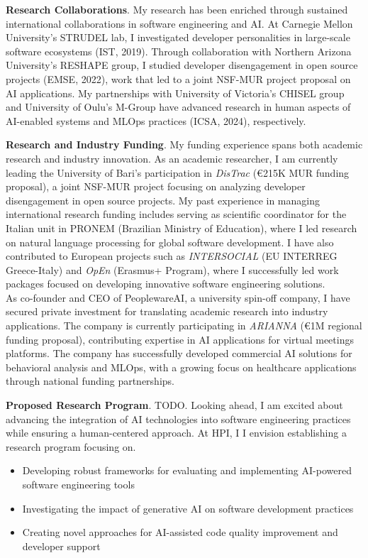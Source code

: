 \textbf{Research Collaborations}.
My research has been enriched through sustained international collaborations in software engineering and AI.
At Carnegie Mellon University's STRUDEL lab, I investigated developer personalities in large-scale software ecosystems (IST, 2019). 
Through collaboration with Northern Arizona University's RESHAPE group, I studied developer disengagement in open source projects (EMSE, 2022), work that led to a joint NSF-MUR project proposal on AI applications.
My partnerships with University of Victoria's CHISEL group and University of Oulu's M-Group have advanced research in human aspects of AI-enabled systems and MLOps practices (ICSA, 2024), respectively.

\textbf{Research and Industry Funding}.
My funding experience spans both academic research and industry innovation. As an academic researcher, I am currently leading the University of Bari's participation in \textit{DisTrac} (€215K MUR funding proposal), a joint NSF-MUR project focusing on analyzing developer disengagement in open source projects.
My past experience in managing international research funding includes serving as scientific coordinator for the Italian unit in PRONEM (Brazilian Ministry of Education), where I led research on natural language processing for global software development. 
I have also contributed to European projects such as \textit{INTERSOCIAL} (EU INTERREG Greece-Italy) and \textit{OpEn} (Erasmus+ Program), where I successfully led work packages focused on developing innovative software engineering solutions.\\
As co-founder and CEO of PeoplewareAI, a university spin-off company, I have secured private investment for translating academic research into industry applications. The company is currently participating in \textit{ARIANNA} (€1M regional funding proposal), contributing expertise in AI applications for virtual meetings platforms. The company has successfully developed commercial AI solutions for behavioral analysis and MLOps, with a growing focus on healthcare applications through national funding partnerships.

\textbf{Proposed Research Program}. TODO.
Looking ahead, I am  excited about advancing the integration of AI technologies into software engineering practices while ensuring a human-centered approach. At HPI, I I envision establishing a research program focusing on.

\begin{itemize}
\item Developing robust frameworks for evaluating and implementing AI-powered software engineering tools
\item Investigating the impact of generative AI on software development practices
\item Creating novel approaches for AI-assisted code quality improvement and developer support
\end{itemize}

